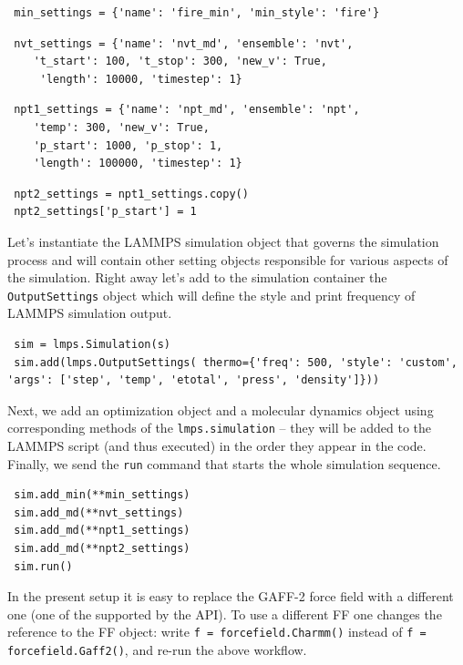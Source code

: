 \documentclass[9pt,tutorial]{livecoms}
\begin{document}
\begin{lstlisting}
 min_settings = {'name': 'fire_min', 'min_style': 'fire'}
\end{lstlisting}

\begin{lstlisting}
 nvt_settings = {'name': 'nvt_md', 'ensemble': 'nvt',
    't_start': 100, 't_stop': 300, 'new_v': True,
     'length': 10000, 'timestep': 1}
\end{lstlisting}

\begin{lstlisting}
 npt1_settings = {'name': 'npt_md', 'ensemble': 'npt',
    'temp': 300, 'new_v': True,
    'p_start': 1000, 'p_stop': 1,
    'length': 100000, 'timestep': 1}
\end{lstlisting}

\begin{lstlisting}
 npt2_settings = npt1_settings.copy()
 npt2_settings['p_start'] = 1
\end{lstlisting}

Let's instantiate the LAMMPS simulation object that governs the simulation process and will contain other setting objects responsible for various aspects of the simulation. Right away let's add to the simulation container the \lstinline$OutputSettings$ object which will define the style and print frequency of LAMMPS simulation output. 

\begin{lstlisting}
 sim = lmps.Simulation(s)
 sim.add(lmps.OutputSettings( thermo={'freq': 500, 'style': 'custom', 
'args': ['step', 'temp', 'etotal', 'press', 'density']}))
\end{lstlisting}

Next, we add an optimization object and a molecular dynamics object using corresponding methods of the \lstinline$lmps.simulation$ -- they will be added to the LAMMPS script (and thus executed) in the order they appear in the code. Finally, we send the \lstinline$run$ command that starts the whole simulation sequence.

\begin{lstlisting}
 sim.add_min(**min_settings)
 sim.add_md(**nvt_settings)
 sim.add_md(**npt1_settings)
 sim.add_md(**npt2_settings)
 sim.run()
\end{lstlisting}

In the present setup it is easy to replace the GAFF-2 force field with a different one (one of the supported by the API). To use a different FF one changes the reference to the FF object: write \lstinline$f = forcefield.Charmm()$ instead of \lstinline$f = forcefield.Gaff2()$, and re-run the above workflow.
\end{document}
